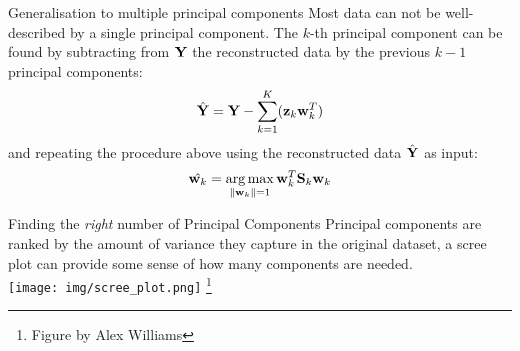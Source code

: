 \documentclass[aspectratio=169,notes]{beamer}
\newcommand\blfootnote[1]{%
  \begingroup
  \renewcommand\thefootnote{}\footnote{#1}%
  \addtocounter{footnote}{-1}%
  \endgroup
}
\begin{document}


	\begin{frame}{Generalisation to multiple principal components}
	Most data can not be well-described by a single principal component. The $k$-th principal component can be found by subtracting from ${\bf Y}$ the reconstructed data by the previous $k-1$ principal components: 
	\[
		\hat{{\bf Y}} = {\bf Y} - \sum_{k=1}^{K} ({\bf z}_k {\bf w}_k^T)
	\]
	and repeating the procedure above using the reconstructed data $\hat{{\bf Y}}$ as input:
	\[
		\hat{{\bf w}_k} = \operatorname*{arg\,max}_{\|{\bf w}_k\|=1} {\bf w}_{k}^{T} {\bf S}_k {\bf w}_k
	\]
	\end{frame}

	\begin{frame}{Finding the \textit{right} number of Principal Components}
	Principal components are ranked by the amount of variance they capture in the original dataset, a scree plot can provide some sense of how many components are needed.\\
	\leavevmode\newline
	\centering
	\texttt{[image: img/scree\_plot.png]}
	\blfootnote{Figure by Alex Williams} %
	\end{frame}



\end{document}
